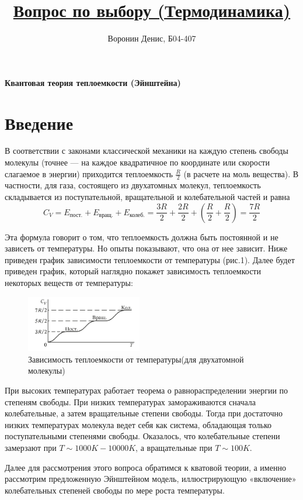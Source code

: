 \documentclass[a4paper]{article}
\title{\underline{Вопрос по выбору (Термодинамика)}}
\author{Воронин Денис, Б04-407}
\date{}
\begin{document}
\maketitle
\begin{center}
\textbf{\Large Квантовая теория теплоемкости (Эйнштейна)}
\end{center}

\section{Введение}

В соответствии с законами классической механики на каждую степень свободы молекулы
(точнее — на каждое квадратичное по координате или скорости слагаемое в энергии) приходится теплоемкость
$\frac{R}{2}$ (в расчете на моль вещества). В частности, для газа, состоящего из двухатомных молекул, теплоемкость
складывается из поступательной, вращательной и колебательной частей и равна
\[C_{V} = E_{\text{пост.}}+E_{\text{вращ.}}+E_{\text{колеб.}}= \frac{3R}{2}+\frac{2R}{2}+(\frac{R}{2}+\frac{R}{2})=\frac{7R}{2}\]

Эта формула говорит о том, что теплоемкость должна быть постоянной и не зависеть от температуры. 
Но опыты показывают, что она от нее зависит. Ниже приведен график зависимости теплоемкости от температуры (рис.1). Далее будет приведен график, который наглядно покажет зависимость теплоемкости 
некоторых веществ от температуры:

\begin{figure}[htbp]
    \centering
    \includegraphics[width=0.45\textwidth]{pick1.png}
    \caption{Зависимость теплоемкости от температуры(для двухатомной молекулы)}
    \label{fig:example}
\end{figure}

При высоких температурах работает теорема о равнораспределении энергии по степеням свободы. 
При низких температурах замораживаются сначала колебательные, а затем вращательные степени свободы. Тогда при достаточно
низких температурах молекула ведет себя как система, обладающая только поступательными степенями свободы.
Оказалось, что колебательные степени замерзают при $T\sim 1000 K - 10000 K$, а вращательные при $T\sim 100 K$.\par
Далее для рассмотрения этого вопроса обратимся к кватовой теории, а именно рассмотрим предложенную Эйнштейном модель, иллюстрирующую «включение» колебательных степеней 
свободы по мере роста температуры.
\end{document}
